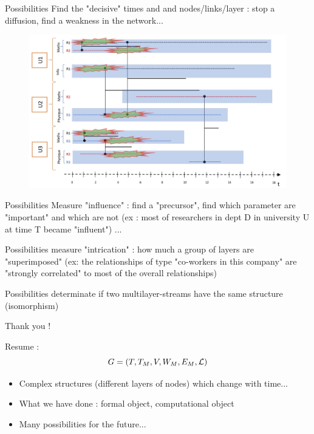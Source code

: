 \documentclass[15pt]{beamer}
\begin{document}
\begin{frame}{Possibilities}
Find the "decisive" times and and nodes/links/layer : stop a diffusion, find a weakness in the network...
\begin{figure}
	\centering
    \includegraphics[width=\linewidth]{img/epidemiet1.jpg}
    \label{fig:chercheurs}	
\end{figure}
\end{frame}

\begin{frame}{Possibilities}
Measure "influence" : find a "precursor", find which parameter are "important" and which are not (ex : most of researchers in dept D in university U at time T became "influent") ...\pause
\end{frame}
\begin{frame}{Possibilities}
     measure "intrication" : how much a group of layers are "superimposed" (ex: the relationships of type "co-workers in this company" are "strongly correlated" to most of the overall relationships)\pause
\end{frame}
\begin{frame}{Possibilities}
     determinate if two multilayer-streams have the same structure (isomorphism)
\end{frame}

\begin{frame}{Thank you !}

Resume :
\[
G=(T,T_M,V,W_M,E_M,\cal{L})
\]
\begin{itemize}
	\item Complex structures (different layers of nodes) which change with time...
	\item What we have done : formal object, computational object 
	\item Many possibilities for the future...
\end{itemize}



\end{frame}
\end{document}
